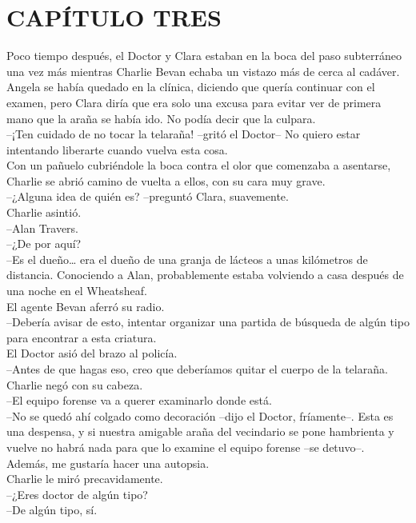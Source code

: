 \chapter*{CAPÍTULO TRES}
Poco tiempo después, el Doctor y Clara estaban en la boca del paso
subterráneo una vez más mientras Charlie Bevan echaba un vistazo más de
cerca al cadáver. Angela se había quedado en la clínica, diciendo que
quería continuar con el examen, pero Clara diría que era solo una excusa
para evitar ver de primera mano que la araña se había ido. No podía
decir que la culpara.\\
--¡Ten cuidado de no tocar la telaraña! --gritó el Doctor-- No quiero
estar intentando liberarte cuando vuelva esta cosa.\\
Con un pañuelo cubriéndole la boca contra el olor que comenzaba a
asentarse, Charlie se abrió camino de vuelta a ellos, con su cara muy
grave.\\
--¿Alguna idea de quién es? --preguntó Clara, suavemente.\\
Charlie asintió.\\
--Alan Travers.\\
--¿De por aquí?\\
--Es el dueño\ldots{} era el dueño de una granja de lácteos a unas
kilómetros de distancia. Conociendo a Alan, probablemente estaba
volviendo a casa después de una noche en el Wheatsheaf.\\
El agente Bevan aferró su radio.\\
--Debería avisar de esto, intentar organizar una partida de búsqueda de
algún tipo para encontrar a esta criatura.\\
El Doctor asió del brazo al policía.\\
--Antes de que hagas eso, creo que deberíamos quitar el cuerpo de la
telaraña.\\
Charlie negó con su cabeza.\\
--El equipo forense va a querer examinarlo donde está.\\
--No se quedó ahí colgado como decoración --dijo el Doctor, fríamente--.
Esta es una despensa, y si nuestra amigable araña del vecindario se pone
hambrienta y vuelve no habrá nada para que lo examine el equipo forense
--se detuvo--. Además, me gustaría hacer una autopsia.\\
Charlie le miró precavidamente.\\
--¿Eres doctor de algún tipo?\\
--De algún tipo, sí.\\
